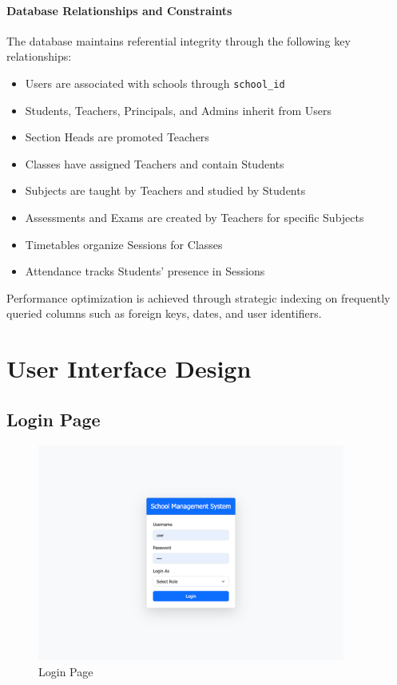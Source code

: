 \documentclass[12pt,a4paper]{report}
\begin{document}
\subsubsection{Database Relationships and Constraints}
The database maintains referential integrity through the following key relationships:
\begin{itemize}
    \item Users are associated with schools through \texttt{school\_id}
    \item Students, Teachers, Principals, and Admins inherit from Users
    \item Section Heads are promoted Teachers
    \item Classes have assigned Teachers and contain Students
    \item Subjects are taught by Teachers and studied by Students
    \item Assessments and Exams are created by Teachers for specific Subjects
    \item Timetables organize Sessions for Classes
    \item Attendance tracks Students' presence in Sessions
\end{itemize}

Performance optimization is achieved through strategic indexing on frequently queried columns such as foreign keys, dates, and user identifiers.

\chapter{User Interface Design}
\section{Login Page}
\begin{figure}[htbp]
    \centering
    \includegraphics[width=0.9\textwidth]{login-page.png}
    \caption{Login Page}
    \label{fig:login-page}
\end{figure}
\end{document}
